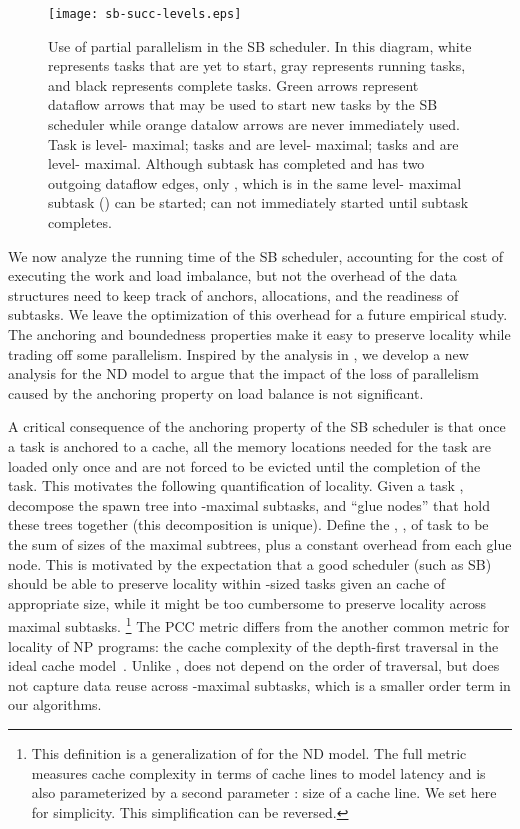 \begin{figure}[!th]
\texttt{[image: sb-succ-levels.eps]}
\vspace{1ex}
\caption{Use of partial parallelism in the SB scheduler.  In this
  diagram, white represents tasks that are yet to start, gray
  represents running tasks, and black represents complete tasks.
  Green arrows represent dataflow arrows that may be used to start new
  tasks by the SB scheduler while orange datalow arrows are never
  immediately used.  Task  is level- maximal; tasks 
  and  are level- maximal; tasks  and
   are level- maximal.  Although subtask  has
  completed and has two outgoing dataflow edges, only , which
  is in the same level- maximal subtask () can be
  started;  can not immediately started until subtask 
  completes.
\label{fig:succ-levels}}
\end{figure}




 We now analyze the running time of the SB scheduler,
accounting for the cost of executing the work and load imbalance, but
not the overhead of the data structures need to keep track of anchors,
allocations, and the readiness of subtasks. We leave the optimization
of this overhead for a future empirical study.  The anchoring and
boundedness properties make it easy to preserve locality while trading
off some parallelism. Inspired by the analysis in
\cite{BlellochFiGi11,Simhadri13}, we develop a new analysis for the
ND model to argue that the impact of the loss of parallelism caused by
the anchoring property on load balance is not significant.

A critical consequence of the anchoring property of the SB scheduler
is that once a task is anchored to a cache, all the memory locations
needed for the task are loaded only once and are not forced to be
evicted until the completion of the task. This motivates the following
quantification of locality.  Given a task , decompose the spawn
tree into -maximal subtasks, and ``glue nodes'' that hold these
trees together (this decomposition is unique).  Define the
, , of task  
to be the sum of sizes of the maximal subtrees, plus a constant
overhead from each glue node. This is motivated by the expectation
that a good scheduler (such as SB) should be able to preserve locality
within -sized tasks given an cache of appropriate size, while it
might be too cumbersome to preserve locality across maximal
subtasks. \footnote{This definition is a generalization
of \cite[Defn.2]{BlellochFiGi11} for the ND model.  The full metric
measures cache complexity in terms of cache lines to model latency and
is also parameterized by a second parameter : size of a cache
line. We set  here for simplicity.  This simplification can be
reversed.}  The PCC metric differs from the another common metric for
locality of NP programs: the cache complexity  of the depth-first
traversal in the ideal cache model~\cite{AcarBlBl00}. Unlike ,
 does not depend on the order of traversal, but does not capture
data reuse across -maximal subtasks, which is a smaller order term
in our algorithms.

